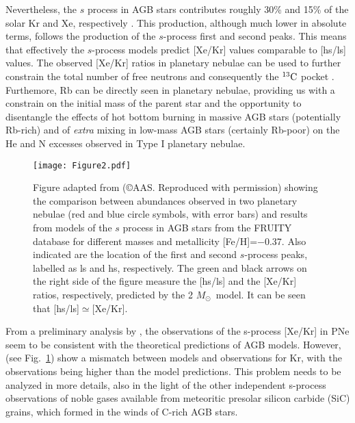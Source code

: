 \documentclass{iau}
\newcommand{\iso}[2]{\hbox{${}^{#1}{\rm #2}$}}
\newcommand{\msun}{\ensuremath{{M}_{\odot}}}
\begin{document}
Nevertheless, the $s$ process in AGB stars contributes 
roughly 30\% and 15\% of the solar Kr and Xe, respectively \citep[][]{bisterzo14}. 
This production, although much lower in 
absolute terms, follows the production of the $s$-process first and second peaks. This 
means that effectively the $s$-process models predict [Xe/Kr] values comparable to [hs/ls] 
values. The observed [Xe/Kr] ratios in planetary nebulae can be used to 
further constrain the total number of free neutrons and consequently the \iso{13}C 
pocket \citep[][]{sharpee07,pignatari08}. 
Furthemore, Rb can be directly seen in planetary nebulae, providing us with a 
constrain on the initial mass of the parent star and the opportunity to disentangle the 
effects of hot bottom burning in massive AGB stars (potentially Rb-rich) and of {\it 
extra} mixing in low-mass AGB stars (certainly Rb-poor) on the He and N excesses observed 
in Type I planetary nebulae.

\begin{figure}[h]
\begin{center}
 \texttt{[image: Figure2.pdf]} 
 \caption{Figure adapted from \citet{sterling16} (\copyright AAS. Reproduced with permission)
showing the comparison between 
abundances observed in two planetary nebulae (red and blue circle symbols, 
with error bars) 
and results from models of the $s$ process in AGB stars from the FRUITY database 
\citep{cristallo15} for different masses and metallicity [Fe/H]=$-$0.37. 
Also indicated are the 
location of the first and second $s$-process peaks, labelled as ls and hs, respectively. 
The green and black arrows on the right side of the figure measure the [hs/ls] and the
[Xe/Kr] ratios, respectively, predicted by the 2 \msun\ model. It can be seen that 
[hs/ls]$\simeq$[Xe/Kr].}
   \label{fig2}
\end{center}
\end{figure}

From a preliminary analysis by \cite{pignatari08}, the observations of the 
s-process [Xe/Kr] in PNe seem 
to be consistent with the theoretical predictions of AGB models. 
However, \cite{sterling16} (see Fig.~\ref{fig2}) show a mismatch between 
models and observations for Kr, with the observations being higher than the model 
predictions. This problem needs to be analyzed in more details, also in the light 
of the other independent s-process observations of noble gases available
from meteoritic presolar silicon carbide 
(SiC) grains, which formed in the winds of C-rich AGB stars.
\end{document}
